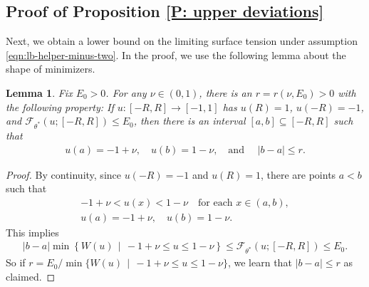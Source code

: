 \documentclass[12pt]{amsart}
\newtheorem{lemma}{Lemma}
\begin{document}
\subsection{Proof of Proposition \ref{P: upper deviations}} Next, we obtain a lower bound on the limiting surface tension under assumption \eqref{eqn:lb-helper-minus-two}. In the proof, we use the following lemma about the shape of minimizers.
	
	\begin{lemma} \label{L: topology lemma} Fix $ E_{0} > 0$. For any $\nu \in (0,1)$, there is an $ r = r (\nu, E_{0}) > 0$ with the following property: If $u : [-R,R] \to [-1,1]$ has $u(R) = 1$, $u(-R) = -1$, and $\mathscr{F}_{\theta^{*}}(u; [-R,R]) \leq E_{0}$, then there is an interval $[a,b] \subseteq [ -R, R ]$ such that 
		\begin{align*}
			u(a) = -1 + \nu, \quad u(b) = 1 - \nu, \quad \text{and} \, \, \quad |b - a| \leq r.
		\end{align*}
	\end{lemma} 
	
		\begin{proof} By continuity, since $u(-R) = -1$ and $u(R) = 1$, there are points $a < b$ such that 
			\begin{gather*}
				-1 + \nu < u(x) < 1 - \nu \quad \text{for each} \, \, x \in (a,b), \\
				u(a) = -1 + \nu, \quad u(b) = 1 - \nu.
			\end{gather*}
		This implies
			\begin{align*}
				|b - a| \min \left\{ W(u) \, \mid \, -1 + \nu \leq u \leq 1 - \nu \right\} \leq \mathscr{F}_{\theta^{*}}(u;[-R,R]) \leq E_{0}.
			\end{align*}
		So if $ r =  E_{0}  / \min \{ W(u) \, \mid \, -1 + \nu \leq u \leq 1 - \nu \} $, we learn that $ |b - a| \leq r $ as claimed.
	\end{proof}
		
\end{document}
